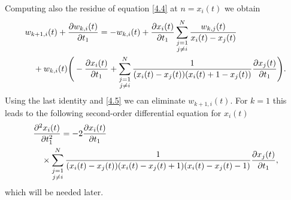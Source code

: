 \documentclass[11pt,reqno]{amsart}
\theoremstyle{definition}
\numberwithin{equation}{section}
\begin{document}
Computing also the residue of equation \eqref{4.4} at $n=x_i(t)$ we obtain
\begin{align*}
&w_{k+1,i}(t)+\frac{\partial w_{k,i}(t)}{\partial t_1}=-w_{k,i}(t) 
+\frac{\partial x_i(t)}{\partial t_1}
\sum_{\begin{subarray}{c}j=1 \\j\neq i\end{subarray}}^N
\frac{w_{k,j}(t)}{x_i(t)-x_j(t)}\\
&\quad+w_{k,i}(t)\Bigg(-\frac{\partial x_i(t)}{\partial t_1}
+\sum_{\begin{subarray}{c}j=1 \\j\neq i\end{subarray}}^N
\frac{1}{(x_i(t)-x_j(t))(x_i(t)+1-x_j(t))}
\frac{\partial x_j(t)}{\partial t_1}\Bigg).
\end{align*}
Using the last identity and \eqref{4.5} we can eliminate $w_{k+1,i}(t)$. For 
$k=1$ this leads to the following second-order differential equation for 
$x_i(t)$
\begin{equation}\label{4.7}
\begin{split}
&\frac{\partial^2 x_i(t)}{\partial t_{1}^2}=-2\frac{\partial x_i(t)}{\partial t_1} \\
&\quad \times\sum_{\begin{subarray}{c}j=1 \\j\neq i\end{subarray}}^N
\frac{1}{(x_i(t)-x_j(t))(x_i(t)-x_j(t)+1)(x_i(t)-x_j(t)-1)}
\frac{\partial x_j(t)}{\partial t_1},
\end{split}
\end{equation}
which will be needed later.
\end{document}
